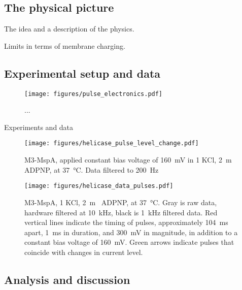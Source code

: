 \subsection{The physical picture}
The idea and a description of the physics.

Limits in terms of membrane charging.

\subsection{Experimental setup and data}

\begin{figure}[h]
\begin{centering}
\texttt{[image: figures/pulse\_electronics.pdf]}
\caption[Electronic setup for low-noise pulses across a nanopore]{...}
\label{fig:helicase_pulse_setup}
\end{centering}
\end{figure}

Experiments and data

\begin{figure}[h]
\begin{centering}
\texttt{[image: figures/helicase\_pulse\_level\_change.pdf]}
\caption[Voltage pulse can induce a helicase step]{M3-MspA, applied constant bias voltage of \SI{160}{\mV} in \SI{1}{\Molar} KCl, \SI{2}{\m\Molar} ADPNP, at \SI{37}{\celsius}. Data filtered to \SI{200}{\Hz}}
\label{fig:helicase_pulse}
\end{centering}
\end{figure}

\begin{figure}[h]
\begin{centering}
\texttt{[image: figures/helicase\_data\_pulses.pdf]}
\caption[A fraction of pulses move the helicase]{M3-MspA, \SI{1}{\Molar} KCl, \SI{2}{\m\Molar} ADPNP, at \SI{37}{\celsius}.  Gray is raw data, hardware filtered at \SI{10}{\kHz}, black is \SI{1}{\kHz} filtered data.  Red vertical lines indicate the timing of pulses, approximately \SI{104}{\ms} apart, \SI{1}{\ms} in duration, and \SI{300}{\mV} in magnitude, in addition to a constant bias voltage of \SI{160}{\mV}.  Green arrows indicate pulses that coincide with changes in current level.}
\label{fig:helicase_pulse_traces}
\end{centering}
\end{figure}

\subsection{Analysis and discussion}

